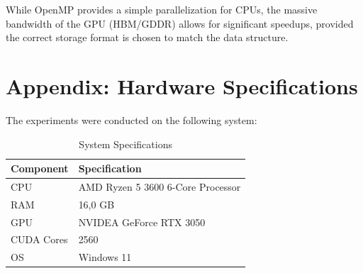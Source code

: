 \documentclass[a4paper,12pt]{article}
\begin{document}
While OpenMP provides a simple parallelization for CPUs, the massive bandwidth of the GPU (HBM/GDDR) allows for significant speedups, provided the correct storage format is chosen to match the data structure.

\appendix
\section{Appendix: Hardware Specifications}
The experiments were conducted on the following system:

\begin{table}[H]
    \centering
    \begin{tabular}{|l|l|}
    \hline
    \textbf{Component} & \textbf{Specification} \\
    \hline
    CPU & AMD Ryzen 5 3600 6-Core Processor  \\
    \hline
    RAM & 16,0 GB \\
    \hline
    GPU & NVIDEA GeForce RTX 3050 \\
    \hline
    CUDA Cores & 2560 \\
    \hline
    OS & Windows 11 \\
    \hline
    \end{tabular}
    \caption{System Specifications}
\end{table}
\end{document}
